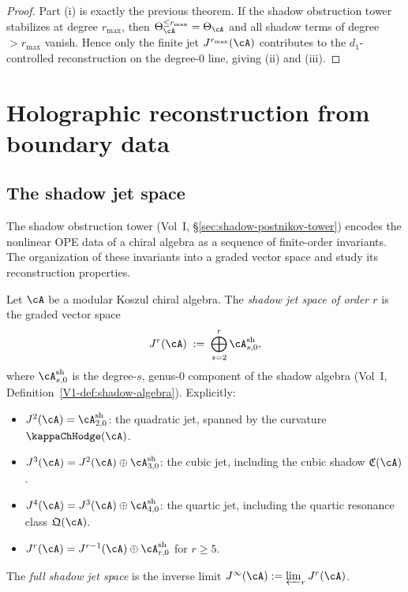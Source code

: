 \begin{proof}
Part \textup{(i)} is exactly the previous theorem. If the shadow obstruction tower
stabilizes at degree $r_{\max}$, then $\Theta_\cA^{\leq r_{\max}} = \Theta_\cA$ and
all shadow terms of degree $> r_{\max}$ vanish. Hence only the finite jet
$J^{r_{\max}}(\cA)$ contributes to the $d_1$-controlled reconstruction on the
degree-$0$ line, giving \textup{(ii)} and \textup{(iii)}.
\end{proof}



\section{Holographic reconstruction from boundary data}

\subsection{The shadow jet space}

The shadow obstruction tower (Vol~I, \S\ref*{sec:shadow-postnikov-tower}) encodes the nonlinear
OPE data of a chiral algebra as a sequence of finite-order invariants. The organization of
these invariants into a graded vector space and study its reconstruction properties.

\begin{definition}
Let $\cA$ be a modular Koszul chiral algebra. The \emph{shadow jet space of order $r$}
is the graded vector space
\begin{equation}
J^r(\cA)
\;:=\;
\bigoplus_{s=2}^{r} \cA^{\mathrm{sh}}_{s,0},
\end{equation}
where $\cA^{\mathrm{sh}}_{s,0}$ is the degree-$s$, genus-$0$ component of the shadow
algebra (Vol~I, Definition~\ref*{V1-def:shadow-algebra}). Explicitly:
\begin{itemize}
\item $J^2(\cA) = \cA^{\mathrm{sh}}_{2,0}$: the quadratic jet, spanned by the curvature
 $\kappaChHodge(\cA)$.
\item $J^3(\cA) = J^2(\cA) \oplus \cA^{\mathrm{sh}}_{3,0}$: the cubic jet, including the
 cubic shadow $\mathfrak{C}(\cA)$.
\item $J^4(\cA) = J^3(\cA) \oplus \cA^{\mathrm{sh}}_{4,0}$: the quartic jet, including
 the quartic resonance class $\mathfrak{Q}(\cA)$.
\item $J^r(\cA) = J^{r-1}(\cA) \oplus \cA^{\mathrm{sh}}_{r,0}$ for $r \geq 5$.
\end{itemize}
The \emph{full shadow jet space} is the inverse limit
$J^\infty(\cA) := \varprojlim_r J^r(\cA)$.
\end{definition}

